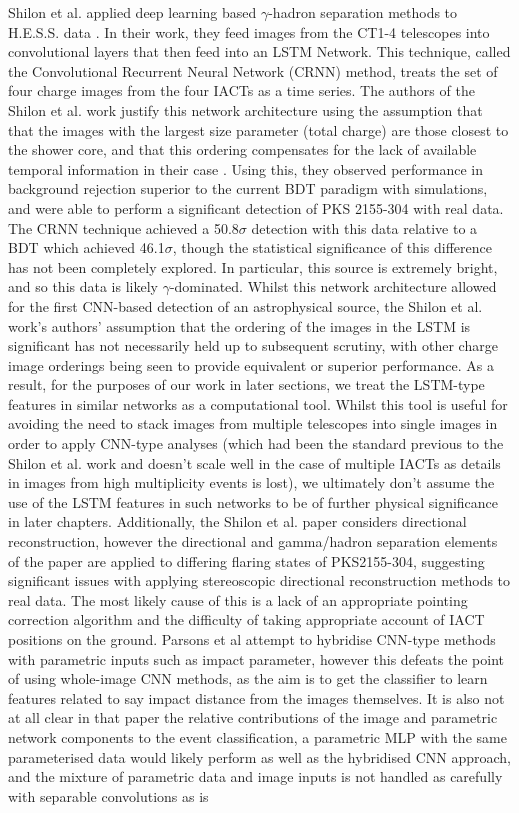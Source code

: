 Shilon et al. \cite{Shilon} applied deep learning based $\gamma$-hadron separation methods to H.E.S.S. data . In their work, they feed images from the CT1-4 telescopes into convolutional layers that then feed into an LSTM Network. This technique, called the Convolutional Recurrent Neural Network (CRNN) method, treats the set of four charge images from the four IACTs as a time series. The authors of the Shilon et al. work justify this network architecture using the assumption that that the images with the largest size parameter (total charge) are those closest to the shower core, and that this ordering compensates for the lack of available temporal information in their case \cite{Shilon}. Using this, they observed performance in background rejection superior to the current BDT paradigm with simulations, and were able to perform a significant detection of PKS 2155-304 with real data. The CRNN technique achieved a 50.8$\sigma$ detection with this data relative to a BDT which achieved 46.1$\sigma$, though the statistical significance of this difference has not been completely explored. In particular, this source is extremely bright, and so this data is likely $\gamma$-dominated. Whilst this network architecture allowed for the first CNN-based detection of an astrophysical source, the Shilon et al. work's authors' assumption that the ordering of the images in the LSTM is significant has not necessarily held up to subsequent scrutiny, with other charge image orderings \cite{ariconf} being seen to provide equivalent or superior performance. As a result, for the purposes of our work in later sections, we treat the LSTM-type features in similar networks as a computational tool. Whilst this tool is useful for avoiding the need to stack images from multiple telescopes into single images in order to apply CNN-type analyses (which had been the standard previous to the Shilon et al. work and doesn't scale well in the case of multiple IACTs \cite{Shilon}\cite{salvatore} as details in images from high multiplicity events is lost), we ultimately don't assume the use of the LSTM features in such networks to be of further physical significance in later chapters. Additionally, the Shilon et al. paper considers directional reconstruction, however the directional and gamma/hadron separation elements of the paper are applied to differing flaring states of PKS2155-304, suggesting significant issues with applying stereoscopic directional reconstruction methods to real data. The most likely cause of this is a lack of an appropriate pointing correction algorithm and the difficulty of taking appropriate account of IACT positions on the ground. Parsons et al \cite{ParsonsOhm} attempt to hybridise CNN-type methods with parametric inputs such as impact parameter, however this defeats the point of using whole-image CNN methods, as the aim is to get the classifier to learn features related to say impact distance from the images themselves. It is also not at all clear in that paper the relative contributions of the image and parametric network components to the event classification, a parametric MLP with the same parameterised data would likely perform as well as the hybridised CNN approach, and the mixture of parametric data and image inputs is not handled as carefully with separable convolutions as is 